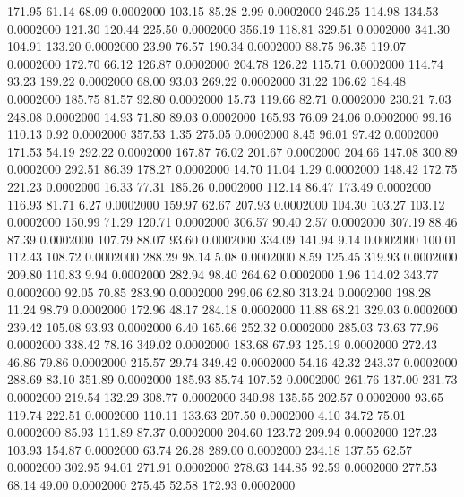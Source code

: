  171.95   61.14   68.09   0.0002000
 103.15   85.28    2.99   0.0002000
 246.25  114.98  134.53   0.0002000
 121.30  120.44  225.50   0.0002000
 356.19  118.81  329.51   0.0002000
 341.30  104.91  133.20   0.0002000
  23.90   76.57  190.34   0.0002000
  88.75   96.35  119.07   0.0002000
 172.70   66.12  126.87   0.0002000
 204.78  126.22  115.71   0.0002000
 114.74   93.23  189.22   0.0002000
  68.00   93.03  269.22   0.0002000
  31.22  106.62  184.48   0.0002000
 185.75   81.57   92.80   0.0002000
  15.73  119.66   82.71   0.0002000
 230.21    7.03  248.08   0.0002000
  14.93   71.80   89.03   0.0002000
 165.93   76.09   24.06   0.0002000
  99.16  110.13    0.92   0.0002000
 357.53    1.35  275.05   0.0002000
   8.45   96.01   97.42   0.0002000
 171.53   54.19  292.22   0.0002000
 167.87   76.02  201.67   0.0002000
 204.66  147.08  300.89   0.0002000
 292.51   86.39  178.27   0.0002000
  14.70   11.04    1.29   0.0002000
 148.42  172.75  221.23   0.0002000
  16.33   77.31  185.26   0.0002000
 112.14   86.47  173.49   0.0002000
 116.93   81.71    6.27   0.0002000
 159.97   62.67  207.93   0.0002000
 104.30  103.27  103.12   0.0002000
 150.99   71.29  120.71   0.0002000
 306.57   90.40    2.57   0.0002000
 307.19   88.46   87.39   0.0002000
 107.79   88.07   93.60   0.0002000
 334.09  141.94    9.14   0.0002000
 100.01  112.43  108.72   0.0002000
 288.29   98.14    5.08   0.0002000
   8.59  125.45  319.93   0.0002000
 209.80  110.83    9.94   0.0002000
 282.94   98.40  264.62   0.0002000
   1.96  114.02  343.77   0.0002000
  92.05   70.85  283.90   0.0002000
 299.06   62.80  313.24   0.0002000
 198.28   11.24   98.79   0.0002000
 172.96   48.17  284.18   0.0002000
  11.88   68.21  329.03   0.0002000
 239.42  105.08   93.93   0.0002000
   6.40  165.66  252.32   0.0002000
 285.03   73.63   77.96   0.0002000
 338.42   78.16  349.02   0.0002000
 183.68   67.93  125.19   0.0002000
 272.43   46.86   79.86   0.0002000
 215.57   29.74  349.42   0.0002000
  54.16   42.32  243.37   0.0002000
 288.69   83.10  351.89   0.0002000
 185.93   85.74  107.52   0.0002000
 261.76  137.00  231.73   0.0002000
 219.54  132.29  308.77   0.0002000
 340.98  135.55  202.57   0.0002000
  93.65  119.74  222.51   0.0002000
 110.11  133.63  207.50   0.0002000
   4.10   34.72   75.01   0.0002000
  85.93  111.89   87.37   0.0002000
 204.60  123.72  209.94   0.0002000
 127.23  103.93  154.87   0.0002000
  63.74   26.28  289.00   0.0002000
 234.18  137.55   62.57   0.0002000
 302.95   94.01  271.91   0.0002000
 278.63  144.85   92.59   0.0002000
 277.53   68.14   49.00   0.0002000
 275.45   52.58  172.93   0.0002000
